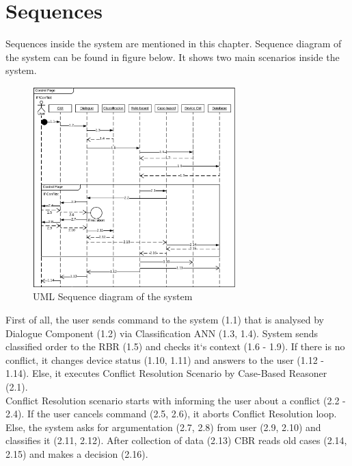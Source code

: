 \documentclass{llncs}
\begin{document}
    \section{Sequences}
    Sequences inside the system are mentioned in this chapter.
    Sequence diagram of the system can be found in figure below.
    It shows two main scenarios inside the system.\\
    \begin{figure} \centering
        \includegraphics[trim=left botm right top, width=0.7\textwidth, clip]{UML.png}
        \caption[]{UML Sequence diagram of the system}
    \end{figure}
    First of all, the user sends command to the system (1.1) that is analysed by Dialogue Component (1.2) via Classification ANN (1.3, 1.4).
    System sends classified order to the RBR (1.5) and checks it`s context (1.6 - 1.9).
    If there is no conflict, it changes device status (1.10, 1.11) and answers to the user (1.12 - 1.14).
    Else, it executes Conflict Resolution Scenario by Case-Based Reasoner (2.1).\\
    Conflict Resolution scenario starts with informing the user about a conflict (2.2 - 2.4).
    If the user cancels command (2.5, 2.6), it aborts Conflict Resolution loop.
    Else, the system asks for argumentation (2.7, 2.8) from user (2.9, 2.10) and classifies it (2.11, 2.12).
    After collection of data (2.13) CBR reads old cases (2.14, 2.15) and makes a decision (2.16).
\end{document}
